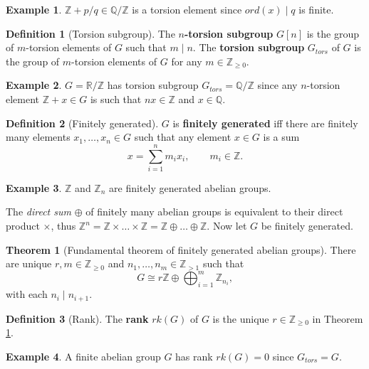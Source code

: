 \documentclass{article}
\newcommand{\Z}{\mathbb{Z}}
\newcommand{\Q}{\mathbb{Q}}
\newcommand{\R}{\mathbb{R}}
\newcommand{\rb}[1]{\left( #1 \right)}
\renewcommand{\sb}[1]{\left[ #1 \right]}
\theoremstyle{definition}
\newtheorem*{definition}{Definition}
\newtheorem*{example}{Example}
\newtheorem{theorem}[proposition]{Theorem}
\begin{document}
\begin{example}
$ \Z + p / q \in \Q / \Z $ is a torsion element since $ ord\rb{x} \mid q $ is finite.
\end{example}

\begin{definition}[Torsion subgroup]
The \textbf{$ n $-torsion subgroup} $ G\sb{n} $ is the group of $ m $-torsion elements of $ G $ such that $ m \mid n $. The \textbf{torsion subgroup} $ G_{tors} $ of $ G $ is the group of $ m $-torsion elements of $ G $ for any $ m \in \Z_{\ge 0} $.
\end{definition}

\begin{example}
$ G = \R / \Z $ has torsion subgroup $ G_{tors} = \Q / \Z $ since any $ n $-torsion element $ \Z + x \in G $ is such that $ nx \in \Z $ and $ x \in \Q $.
\end{example}

\begin{definition}[Finitely generated]
$ G $ is \textbf{finitely generated} iff there are finitely many elements $ x_1, \dots, x_n \in G $ such that any element $ x \in G $ is a sum
$$ x = \sum_{i = 1}^n m_ix_i, \qquad m_i \in \Z. $$
\end{definition}

\begin{example}
$ \Z $ and $ \Z_n $ are finitely generated abelian groups.
\end{example}

The \emph{direct sum} $ \oplus $ of finitely many abelian groups is equivalent to their direct product $ \times $, thus $ \Z^n = \Z \times \dots \times \Z = \Z \oplus \dots \oplus \Z $. Now let $ G $ be finitely generated.

\begin{theorem}[Fundamental theorem of finitely generated abelian groups]
\label{thm:ftfgag}
There are unique $ r, m \in \Z_{\ge 0} $ and $ n_1, \dots, n_m \in \Z_{> 1} $ such that
$$ G \cong r\Z \oplus \bigoplus_{i = 1}^m \Z_{n_i}, $$
with each $ n_i \mid n_{i + 1} $.
\end{theorem}

\begin{definition}[Rank]
The \textbf{rank} $ rk\rb{G} $ of $ G $ is the unique $ r \in \Z_{\ge 0} $ in Theorem \ref{thm:ftfgag}.
\end{definition}

\begin{example}
A finite abelian group $ G $ has rank $ rk\rb{G} = 0 $ since $ G_{tors} = G $.
\end{example}
\end{document}
